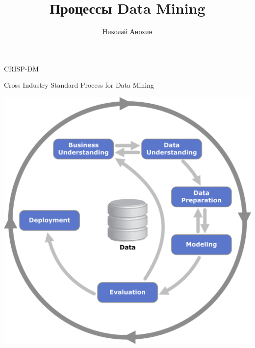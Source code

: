 \documentclass[aspectratio=169]{beamer}
\author{Николай Анохин}
\title{Процессы Data Mining}
\date{}
\begin{document}
\begin{frame}
\titlepage
\end{frame}

\begin{frame}{CRISP-DM}

Cross Industry Standard Process for Data Mining

\begin{center}
\includegraphics[height=0.7\textheight]{images/crisp.png}
\end{center}

\end{frame}
\end{document}
